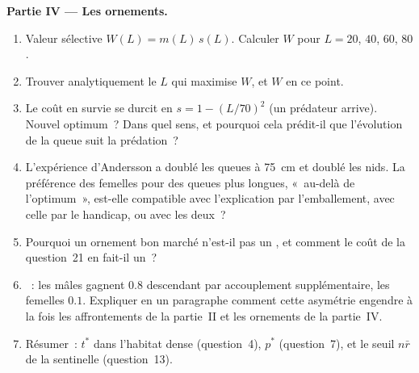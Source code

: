 \begin{problem}
\medskip
\noindent\textbf{Partie IV --- Les ornements.}
\begin{enumerate}[resume]
  \item Valeur sélective $W(L) = m(L)\,s(L)$. Calculer $W$ pour $L = 20$,
        $40$, $60$, $80$.
  \item Trouver analytiquement le $L$ qui maximise $W$, et $W$ en ce
        point.
  \item Le coût en survie se durcit en $s = 1 - (L/70)^{2}$ (un prédateur
        arrive). Nouvel optimum~? Dans quel sens, et pourquoi cela
        prédit-il que l'évolution de la queue suit la prédation~?
  \item L'expérience d'Andersson a doublé les queues à \qty{75}{cm} et
        doublé les nids. La préférence des femelles pour des queues plus
        longues, «~au-delà de l'optimum~», est-elle compatible avec
        l'explication par l'emballement, avec celle par le handicap, ou
        avec les deux~?
  \item Pourquoi un ornement bon marché n'est-il pas un ,
        et comment le coût de la question~21 en fait-il un~?
  \item {}~: les mâles gagnent $0.8$ descendant par
        accouplement supplémentaire, les femelles $0.1$. Expliquer en un
        paragraphe comment cette asymétrie engendre à la fois les
        affrontements de la partie~II et les ornements de la partie~IV.
  \item Résumer~: $t^{*}$ dans l'habitat dense (question~4), $p^{*}$
        (question~7), et le seuil $n\bar r$ de la sentinelle
        (question~13).
\end{enumerate}
\end{problem}
